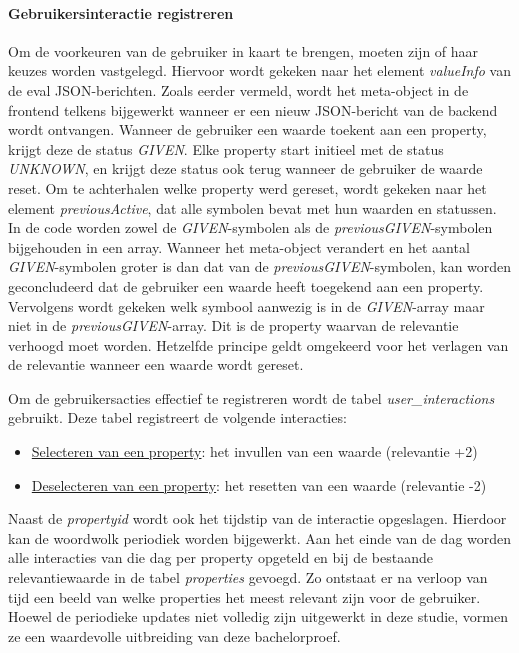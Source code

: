 \paragraph{Gebruikersinteractie registreren}
Om de voorkeuren van de gebruiker in kaart te brengen, moeten zijn of haar keuzes worden vastgelegd. Hiervoor wordt gekeken naar het element \textit{valueInfo} van de eval JSON-berichten. Zoals eerder vermeld, wordt het meta-object in de frontend telkens bijgewerkt wanneer er een nieuw JSON-bericht van de backend wordt ontvangen. Wanneer de gebruiker een waarde toekent aan een property, krijgt deze de status \textit{GIVEN}. Elke property start initieel met de status \textit{UNKNOWN}, en krijgt deze status ook terug wanneer de gebruiker de waarde reset. Om te achterhalen welke property werd gereset, wordt gekeken naar het element \textit{previousActive}, dat alle symbolen bevat met hun waarden en statussen. In de code worden zowel de \textit{GIVEN}-symbolen als de \textit{previousGIVEN}-symbolen bijgehouden in een array. Wanneer het meta-object verandert en het aantal \textit{GIVEN}-symbolen groter is dan dat van de \textit{previousGIVEN}-symbolen, kan worden geconcludeerd dat de gebruiker een waarde heeft toegekend aan een property. Vervolgens wordt gekeken welk symbool aanwezig is in de \textit{GIVEN}-array maar niet in de \textit{previousGIVEN}-array. Dit is de property waarvan de relevantie verhoogd moet worden. Hetzelfde principe geldt omgekeerd voor het verlagen van de relevantie wanneer een waarde wordt gereset. 

Om de gebruikersacties effectief te registreren wordt de tabel \textit{user\_interactions} gebruikt. Deze tabel registreert de volgende interacties:
\begin{itemize}
    \item \underline{Selecteren van een property}: het invullen van een waarde (relevantie +2)
    \item \underline{Deselecteren van een property}: het resetten van een waarde (relevantie -2)
\end{itemize}
Naast de \textit{propertyid} wordt ook het tijdstip van de interactie opgeslagen. Hierdoor kan de woordwolk periodiek worden bijgewerkt. Aan het einde van de dag worden alle interacties van die dag per property opgeteld en bij de bestaande relevantiewaarde in de tabel \textit{properties} gevoegd. Zo ontstaat er na verloop van tijd een beeld van welke properties het meest relevant zijn voor de gebruiker. Hoewel de periodieke updates niet volledig zijn uitgewerkt in deze studie, vormen ze een waardevolle uitbreiding van deze bachelorproef.

